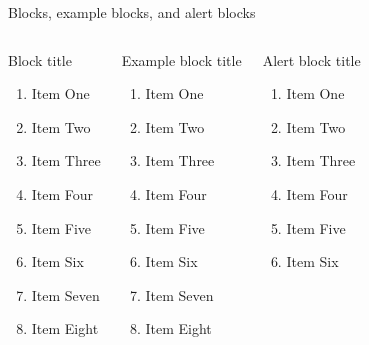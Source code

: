 \documentclass{beamer}
\begin{document}
\begin{frame}{Blocks, example blocks, and alert blocks}
	\scriptsize	
	\begin{columns}[t]
		\begin{block}{Block title}
			\begin{enumerate}
				\item  Item One
				\item  Item Two
				\item  Item Three
				\item  Item Four
				\item  Item Five
				\item  Item Six
				\item  Item Seven
				\item  Item Eight
			\end{enumerate}		 
		\end{block}
		
		\begin{exampleblock}{Example block title} 
			\begin{enumerate}
				\item  Item One
				\item  Item Two
				\item  Item Three
				\item  Item Four
				\item  Item Five
				\item  Item Six
				\item  Item Seven
				\item  Item Eight
			\end{enumerate}	
		\end{exampleblock}
		
		\begin{alertblock}{Alert block title}
			\begin{enumerate}
				\item  Item One
				\item  Item Two
				\item  Item Three
				\item  Item Four
				\item  Item Five
				\item  Item Six
			\end{enumerate}	
		\end{alertblock}
		
	\end{columns} 	
\end{frame}
\end{document}
